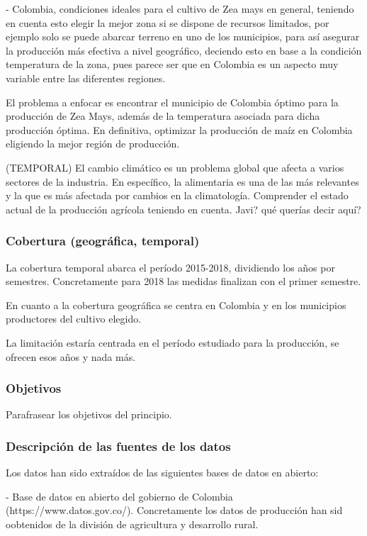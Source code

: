 \documentclass[12pt, spanish]{article}
\begin{document}
- Colombia, condiciones ideales para el cultivo de Zea mays en general, teniendo en cuenta esto elegir la mejor zona si se dispone de recursos limitados, por ejemplo solo se puede abarcar terreno en uno de los municipios, para así asegurar la producción más efectiva a nivel geográfico, deciendo esto en base a la condición temperatura de la zona, pues parece ser que en Colombia es un aspecto muy variable entre las diferentes regiones.

El problema a enfocar es encontrar el municipio de Colombia óptimo para la producción de Zea Mays, además de la temperatura asociada para dicha producción óptima. En definitiva, optimizar la producción de maíz en Colombia eligiendo la mejor región de producción.
        
(TEMPORAL) 
El cambio climático es un problema global que afecta a varios sectores de la industria. En específico, la alimentaria es una de las más relevantes y la que es más afectada por cambios en la climatología. Comprender el estado actual de la producción agrícola teniendo en cuenta. Javi? qué querías decir aquí?

\subsubsection{Cobertura (geográfica, temporal)}

La cobertura temporal abarca el período 2015-2018, dividiendo los años por   semestres. Concretamente para 2018 las medidas finalizan con el primer semestre.

En cuanto a la cobertura geográfica se centra en Colombia y en los municipios productores del cultivo elegido.

La limitación estaría centrada en el período estudiado para la producción, se ofrecen esos años y nada más.

\subsubsection{Objetivos}

Parafrasear los objetivos del principio.

\subsubsection{Descripción de las fuentes de los datos}

Los datos han sido extraídos de las siguientes bases de datos en abierto: 

- Base de datos en abierto del gobierno de Colombia (https://www.datos.gov.co/). Concretamente los datos de producción han sid oobtenidos de la división de agricultura y desarrollo rural.
\end{document}
